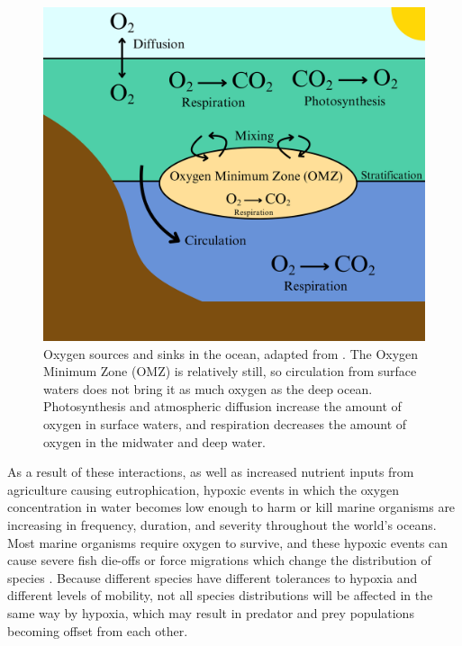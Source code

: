 \documentclass[12pt,twoside]{reedthesis}
\begin{document}
\begin{figure}[htbp]
	\begin{center}
		\includegraphics[scale=0.1]{Fig_OMZ}
		\caption[Oxygen circulation]{\footnotesize{Oxygen sources and sinks in the ocean, adapted from \autocite{Deutsch2024}. The Oxygen Minimum Zone (OMZ) is relatively still, so circulation from surface waters does not bring it as much oxygen as the deep ocean. Photosynthesis and atmospheric diffusion increase the amount of oxygen in surface waters, and respiration decreases the amount of oxygen in the midwater and deep water.}} %
	\end{center}
	\label{OMZ}
\end{figure} 

As a result of these interactions, as well as increased nutrient inputs from agriculture causing eutrophication, hypoxic events in which the oxygen concentration in water becomes low enough to harm or kill marine organisms are increasing in frequency, duration, and severity throughout the world's oceans. Most marine organisms require oxygen to survive, and these hypoxic events can cause severe fish die-offs or force migrations which change the distribution of species \autocite{Pihl1991, Miller2002}. Because different species have different tolerances to hypoxia and different levels of mobility, not all species distributions will be affected in the same way by hypoxia, which may result in predator and prey populations becoming offset from each other. 
\end{document}
